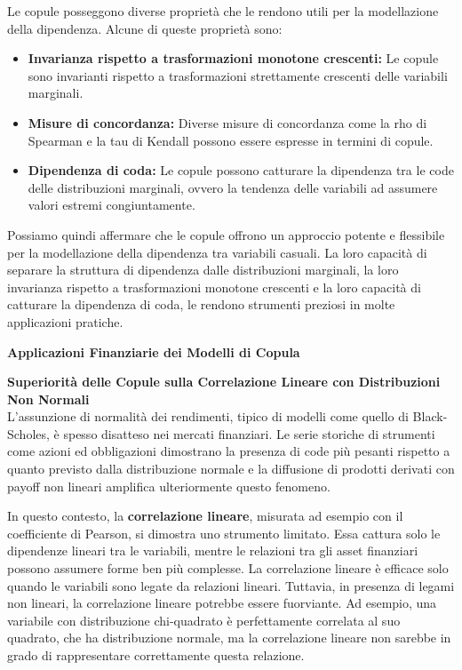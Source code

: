 \documentclass[a4paper,12pt]{article}
\begin{document}
\noindent Le copule posseggono diverse proprietà che le rendono utili per la modellazione della dipendenza. Alcune di queste proprietà sono:
\renewcommand{\labelitemi}{\textbullet}
\begin{itemize}
	\item \textbf{Invarianza rispetto a trasformazioni monotone crescenti:} Le copule sono invarianti rispetto a trasformazioni strettamente crescenti delle variabili marginali.
	\item \textbf{Misure di concordanza:} Diverse misure di concordanza come la rho di Spearman e la tau di Kendall possono essere espresse in termini di copule.
	\item \textbf{Dipendenza di coda:} Le copule possono catturare la dipendenza tra le code delle distribuzioni marginali, ovvero la tendenza delle variabili ad assumere valori estremi congiuntamente.
\end{itemize}

\noindent Possiamo quindi affermare che le copule offrono un approccio potente e flessibile per la modellazione della dipendenza tra variabili casuali. La loro capacità di separare la struttura di dipendenza dalle distribuzioni marginali, la loro invarianza rispetto a trasformazioni monotone crescenti e la loro capacità di catturare la dipendenza di coda, le rendono strumenti preziosi in molte applicazioni pratiche.

\newpage

\begin{center}
	\Huge \textbf{Applicazioni Finanziarie dei Modelli di Copula} 
\end{center}

\vspace{1cm}
\noindent\textbf{Superiorità delle Copule sulla Correlazione Lineare con Distribuzioni Non Normali} \\

\noindent L'assunzione di normalità dei rendimenti, tipico di modelli come quello di Black-Scholes, è spesso disatteso nei mercati finanziari. Le serie storiche di strumenti come azioni ed obbligazioni dimostrano la presenza di code più pesanti rispetto a quanto previsto dalla distribuzione normale e la diffusione di prodotti derivati con payoff non lineari amplifica ulteriormente questo fenomeno.  

\noindent In questo contesto, la \textbf{correlazione lineare}, misurata ad esempio con il coefficiente di Pearson, si dimostra uno strumento limitato.  Essa cattura solo le dipendenze lineari tra le variabili, mentre le relazioni tra gli asset finanziari possono assumere forme ben più complesse. La correlazione lineare è efficace solo quando le variabili sono legate da relazioni lineari. Tuttavia, in presenza di legami non lineari, la correlazione lineare potrebbe essere fuorviante. Ad esempio, una variabile con distribuzione chi-quadrato è perfettamente correlata al suo quadrato, che ha distribuzione normale, ma la correlazione lineare non sarebbe in grado di rappresentare correttamente questa relazione. \\
\end{document}
